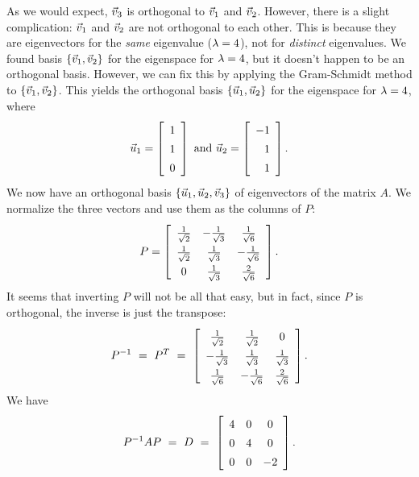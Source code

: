 \documentclass{ximera}
\begin{document}
\begin{solution}
  As we would expect,
  $\vec{v}_3$ is orthogonal to $\vec{v}_1$ and
  $\vec{v}_2$. However, there is a slight complication: $\vec{v}_1$
  and $\vec{v}_2$ are not orthogonal to each other. This is because
  they are eigenvectors for the {\em same} eigenvalue ($\lambda=4$),
  not for {\em distinct} eigenvalues. We found basis
  $\left\{\vec{v}_1,\vec{v}_2\right\}$ for the eigenspace for $\lambda=4$,
  but it doesn't happen to be an orthogonal basis. However, we can fix
  this by applying the Gram-Schmidt method to
  $\left\{\vec{v}_1,\vec{v}_2\right\}$. This yields the orthogonal basis
  $\left\{\vec{u}_1,\vec{u}_2\right\}$ for the eigenspace for $\lambda=4$,
  where
  \begin{equation*}
    \vect{u}_1 = \startmat{r} 1 \\ 1 \\ 0 \stopmat
    \quad\mbox{and}\quad
    \vect{u}_2 = \startmat{r} -1 \\ 1 \\ 1 \stopmat.
\end{equation*}
We now have an orthogonal basis
$\left\{\vec{u}_1,\vec{u}_2,\vec{v}_3\right\}$ of eigenvectors of the
matrix $A$. We normalize the three vectors and use them as the
columns of $P$:
\begin{equation*}
    \def\arraystretch{1.4}
    P = \startmat{ccc}
      \frac{1}{\sqrt{2}} & -\frac{1}{\sqrt{3}} & \frac{1}{\sqrt{6}}  \\
      \frac{1}{\sqrt{2}} & \frac{1}{\sqrt{3}}  & -\frac{1}{\sqrt{6}} \\
      0                  & \frac{1}{\sqrt{3}}  & \frac{2}{\sqrt{6}}  \\
    \stopmat.
\end{equation*}
It seems that inverting $P$ will not be all that easy, but in fact,
since $P$ is orthogonal, the inverse is just the transpose:
\begin{equation*}
    \def\arraystretch{1.4}
    P^{-1}
    ~=~ P^T
    ~=~ \startmat{ccc}
      \frac{1}{\sqrt{2}}  & \frac{1}{\sqrt{2}}  & 0 \\
      -\frac{1}{\sqrt{3}} & \frac{1}{\sqrt{3}}  & \frac{1}{\sqrt{3}} \\
      \frac{1}{\sqrt{6}}  & -\frac{1}{\sqrt{6}} & \frac{2}{\sqrt{6}} \\
    \stopmat.
\end{equation*}
We have
\begin{equation*}
    P^{-1}AP
    ~=~ D
    ~=~ \startmat{ccc} 4 & 0 & 0 \\ 0 & 4 & 0 \\ 0 & 0 & -2 \stopmat.
\end{equation*}

\end{solution}
\end{document}
